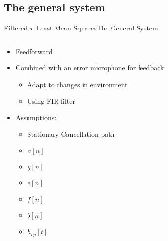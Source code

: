 \subsection{The general system}
\begin{frame}{Filtered-$x$ Least Mean Squares}{The General System}
	\begin{columns}
		\begin{column}{0.5\textwidth}		

		\begin{itemize}
		\item Feedforward
		\item Combined with an error microphone for feedback
		\begin{itemize}
		\item Adapt to changes in environment
		\item Using FIR filter		
		\end{itemize}
		\item Assumptions:
		\begin{itemize}
		\item Stationary Cancellation path
		\end{itemize}

		\begin{itemize}
			\setlength{\itemindent}{4em}
			\item[Input] $x[n]$
			\item[Output]$y[n]$
			\item[Error] $e[n]$	
			\item[Filtered x] $f[n]$
			\item[Filter coefficients] $b[n]$	
			\item[Cancellation Path] $h_{cp}[t]$		
		\end{itemize}

		\end{itemize}

		
		\end{column}
		\begin{column}{0.5\textwidth}
		\resizebox{1.1\columnwidth}{!}{	
		
		}
		\end{column}
	\end{columns}
\end{frame}


